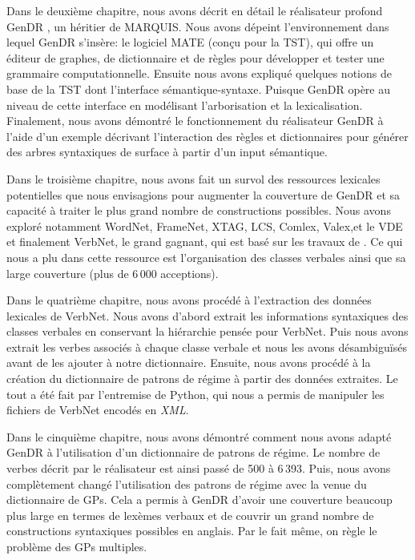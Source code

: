 Dans le deuxième chapitre, nous avons décrit en détail le réalisateur profond GenDR \citep{lareau18}, un héritier de MARQUIS. Nous avons dépeint l'environnement dans lequel GenDR s'insère: le logiciel MATE (conçu pour la TST), qui offre un éditeur de graphes, de dictionnaire et de règles pour développer et tester une grammaire computationnelle. Ensuite nous avons expliqué quelques notions de base de la \ac{TST} dont l'interface sémantique-syntaxe. Puisque GenDR opère au niveau de cette interface en modélisant l'arborisation et la lexicalisation. Finalement, nous avons démontré le fonctionnement du réalisateur GenDR à l'aide d'un exemple décrivant l'interaction des règles et dictionnaires pour générer des arbres syntaxiques de surface à partir d'un input sémantique.

Dans le troisième chapitre, nous avons fait un survol des ressources lexicales potentielles que nous envisagions pour augmenter la couverture de GenDR et sa capacité à traiter le plus grand nombre de constructions possibles. Nous avons exploré notamment WordNet, FrameNet, XTAG, LCS, Comlex, Valex,et le VDE et finalement VerbNet, le grand gagnant, qui est basé sur les travaux de \cite{verb-classes.levin.1993}. Ce qui nous a plu dans cette ressource est l'organisation des classes verbales ainsi que sa large couverture (plus de 6\,000 acceptions).

Dans le quatrième chapitre, nous avons procédé à l'extraction des données lexicales de VerbNet. Nous avons d'abord extrait les informations syntaxiques des classes verbales en conservant la hiérarchie pensée pour VerbNet. Puis nous avons extrait les verbes associés à chaque classe verbale et nous les avons désambiguïsés avant de les ajouter à notre dictionnaire. Ensuite, nous avons procédé à la création du dictionnaire de patrons de régime à partir des données extraites. Le tout a été fait par l'entremise de Python, qui nous a permis de manipuler les fichiers de VerbNet encodés en \emph{XML}.

Dans le cinquième chapitre, nous avons démontré comment nous avons adapté GenDR à l'utilisation d'un dictionnaire de patrons de régime. Le nombre de verbes décrit par le réalisateur est ainsi passé de 500 à 6\,393. Puis, nous avons complètement changé l'utilisation des patrons de régime avec la venue du dictionnaire de \acp{GP}. Cela a permis à GenDR d'avoir une couverture beaucoup plus large en termes de lexèmes verbaux et de couvrir un grand nombre de constructions syntaxiques possibles en anglais. Par le fait même, on règle le problème des \acp{GP} multiples.
	
